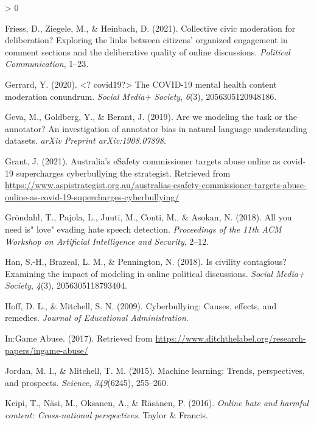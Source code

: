 \documentclass[
  10pt,
  dvipsnames,enabledeprecatedfontcommands]{scrartcl}
\newlength{\cslhangindent}
\newenvironment{CSLReferences}[2] %
 {%
  \setlength{\parindent}{0pt}
  \ifodd #1 \everypar{\setlength{\hangindent}{\cslhangindent}}\ignorespaces\fi
  \ifnum #2 > 0
  \setlength{\parskip}{#2\baselineskip}
  \fi
 }%
 {}
\begin{document}
\begin{CSLReferences}{1}{0}
\leavevmode\hypertarget{ref-friess2021collective}{}%
Friess, D., Ziegele, M., \& Heinbach, D. (2021). Collective civic
moderation for deliberation? Exploring the links between citizens'
organized engagement in comment sections and the deliberative quality of
online discussions. \emph{Political Communication}, 1--23.

\leavevmode\hypertarget{ref-gerrard2020covid19}{}%
Gerrard, Y. (2020). \textless? covid19?\textgreater{} The COVID-19
mental health content moderation conundrum. \emph{Social Media+
Society}, \emph{6}(3), 2056305120948186.

\leavevmode\hypertarget{ref-geva2019we}{}%
Geva, M., Goldberg, Y., \& Berant, J. (2019). Are we modeling the task
or the annotator? An investigation of annotator bias in natural language
understanding datasets. \emph{arXiv Preprint arXiv:1908.07898}.

\leavevmode\hypertarget{ref-grant_2021}{}%
Grant, J. (2021). Australia's eSafety commissioner targets abuse online
as covid-19 supercharges cyberbullying \textbar{} the strategist.
Retrieved from
\url{https://www.aspistrategist.org.au/australias-esafety-commissioner-targets-abuse-online-as-covid-19-supercharges-cyberbullying/}

\leavevmode\hypertarget{ref-grondahl2018all}{}%
Gröndahl, T., Pajola, L., Juuti, M., Conti, M., \& Asokan, N. (2018).
All you need is" love" evading hate speech detection. \emph{Proceedings
of the 11th ACM Workshop on Artificial Intelligence and Security},
2--12.

\leavevmode\hypertarget{ref-han2018civility}{}%
Han, S.-H., Brazeal, L. M., \& Pennington, N. (2018). Is civility
contagious? Examining the impact of modeling in online political
discussions. \emph{Social Media+ Society}, \emph{4}(3),
2056305118793404.

\leavevmode\hypertarget{ref-hoff2009cyberbullying}{}%
Hoff, D. L., \& Mitchell, S. N. (2009). Cyberbullying: Causes, effects,
and remedies. \emph{Journal of Educational Administration}.

\leavevmode\hypertarget{ref-noauthor_:game_nodate}{}%
In:{Game} {Abuse}. (2017). Retrieved from
\url{https://www.ditchthelabel.org/research-papers/ingame-abuse/}

\leavevmode\hypertarget{ref-jordan2015machine}{}%
Jordan, M. I., \& Mitchell, T. M. (2015). Machine learning: Trends,
perspectives, and prospects. \emph{Science}, \emph{349}(6245), 255--260.

\leavevmode\hypertarget{ref-keipi2016online}{}%
Keipi, T., Näsi, M., Oksanen, A., \& Räsänen, P. (2016). \emph{Online
hate and harmful content: Cross-national perspectives}. Taylor \&
Francis.


\end{CSLReferences}
\end{document}
